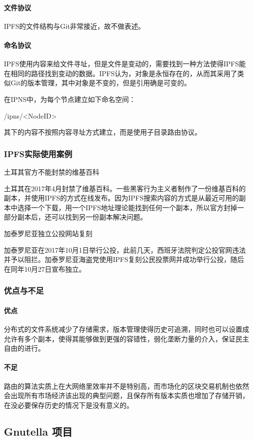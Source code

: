 \documentclass{ctexart}
\begin{document}
\paragraph{文件协议}
IPFS的文件结构与Git非常接近，故不做表述。
\paragraph{命名协议}
IPFS使用内容来给文件寻址，但是文件是变动的，需要找到一种方法使得IPFS能在相同的路径找到变动的数据。IPFS认为，对象是永恒存在的，从而其采用了类似Git的版本管理，其中对象是不变的，但是引用确是可变的。

在IPNS中，为每个节点建立如下命名空间：

/ipns/<NodeID>

其下的内容不按照内容寻址方式建立，而是使用子目录路由协议。
\subsubsection{IPFS实际使用案例}
土耳其官方不能封禁的维基百科

土耳其在2017年4月封禁了维基百科。一些黑客行为主义者制作了一份维基百科的副本，并使用IPFS的方式在线发布。因为IPFS搜索内容的方式是从最近可用的副本中选择一个下载，用一个IPFS地址理论能找到任何一个副本，所以官方封掉一部分副本后，还可以找到另一份副本解决问题。

加泰罗尼亚独立公投网站复刻

加泰罗尼亚在2017年10月1日举行公投，此前几天，西班牙法院判定公投官网违法并予以阻拦。加泰罗尼亚海盗党使用IPFS复刻公民投票网并成功举行公投，随后在同年10月27日宣布独立。
\subsubsection{优点与不足}
\paragraph{优点}
分布式的文件系统减少了存储需求，版本管理使得历史可追溯，同时也可以设置成允许有多个副本，使得其能够做到更强的容错性，弱化垄断力量的介入，保证民主自由的进行。
\paragraph{不足}
路由的算法实质上在大网络里效率并不是特别高，而市场化的区块交易机制也依然会出现所有市场经济该出现的典型问题，且保存所有版本实质也增加了存储开销，在没必要保存历史的情况下是没有意义的。


\subsection{Gnutella 项目}
\end{document}
